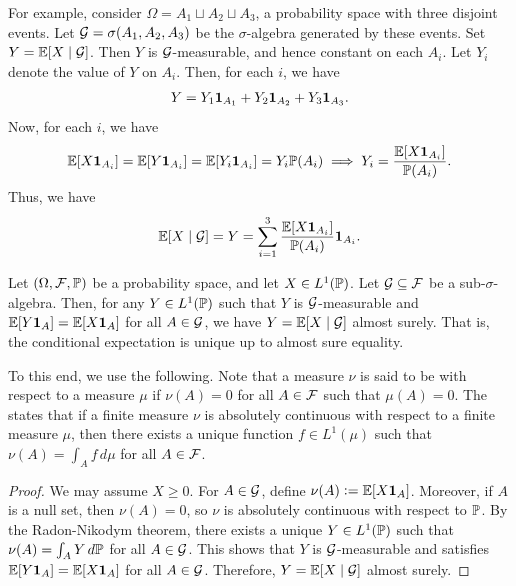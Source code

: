 \begin{example}
    For example, consider $\Omega = A_{1} \sqcup A_{2} \sqcup A_{3}$, a probability space with three disjoint events. Let $\mathcal{G} = \sigma(A_{1},A_{2},A_{3})$ be the $\sigma$-algebra generated by these events. Set $Y = \mathbb{E}[X\mid \mathcal{G}]$. Then $Y$ is $\mathcal{G}$-measurable, and hence constant on each $A_{i}$. Let $Y_{i}$ denote the value of $Y$ on $A_{i}$. Then, for each $i$, we have
    \begin{align}
        Y = Y_{1}\textbf{1}_{A_{1}} + Y_{2}\textbf{1}_{A_{2}} + Y_{3}\textbf{1}_{A_{3}}.
    \end{align}
    Now, for each $i$, we have
    \begin{align}
        \mathbb{E}[X \textbf{1}_{A_{i}}] = \mathbb{E}[Y\textbf{1}_{A_{i}}] = \mathbb{E}[Y_{i}\textbf{1}_{A_{i}}] = Y_{i}\mathbb{P}(A_{i}) \implies Y_{i} = \frac{\mathbb{E}[X\textbf{1}_{A_{i}}]}{\mathbb{P}(A_{i})}.
    \end{align}
    Thus, we have
    \begin{align}
        \mathbb{E}[X\mid \mathcal{G}] = Y = \sum_{i=1}^{3} \frac{\mathbb{E}[X\textbf{1}_{A_{i}}]}{\mathbb{P}(A_{i})}\textbf{1}_{A_{i}}.
    \end{align}
\end{example}

\begin{lemma}
    Let $(\Omega,\mathcal{F},\mathbb{P})$ be a probability space, and let $X \in L^{1}(\mathbb{P})$. Let $\mathcal{G} \subseteq \mathcal{F}$ be a sub-$\sigma$-algebra. Then, for any $Y \in L^{1}(\mathbb{P})$ such that $Y$ is $\mathcal{G}$-measurable and $\mathbb{E}[Y\textbf{1}_{A}] = \mathbb{E}[X\textbf{1}_{A}]$ for all $A \in \mathcal{G}$, we have $Y = \mathbb{E}[X\mid \mathcal{G}]$ almost surely. That is, the conditional expectation is unique up to almost sure equality.
\end{lemma}

To this end, we use the following. Note that a measure $\nu$ is said to be  with respect to a measure $\mu$ if $\nu(A) = 0$ for all $A \in \mathcal{F}$ such that $\mu(A) = 0$. The  states that if a finite measure $\nu$ is absolutely continuous with respect to a finite measure $\mu$, then there exists a unique function $f \in L^{1}(\mu)$ such that $\nu(A) = \int_{A} f\,d\mu$ for all $A \in \mathcal{F}$.

\begin{proof}
    We may assume $X \geq 0$. For $A \in \mathcal{G}$, define $\nu(A) \vcentcolon= \mathbb{E}[X\textbf{1}_{A}]$. Moreover, if $A$ is a null set, then $\nu(A) = 0$, so $\nu$ is absolutely continuous with respect to $\mathbb{P}$. By the Radon-Nikodym theorem, there exists a unique $Y \in L^{1}(\mathbb{P})$ such that $\nu(A) = \int_{A} Y\,d\mathbb{P}$ for all $A \in \mathcal{G}$. This shows that $Y$ is $\mathcal{G}$-measurable and satisfies $\mathbb{E}[Y\textbf{1}_{A}] = \mathbb{E}[X\textbf{1}_{A}]$ for all $A \in \mathcal{G}$. Therefore, $Y = \mathbb{E}[X\mid \mathcal{G}]$ almost surely.
\end{proof}

